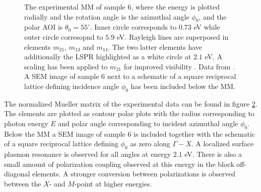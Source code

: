\begin{figure}
\begin{subfigure}{\textwidth}
\begin{subfigure}{0.49\textwidth}
    \end{subfigure}
    \label{fig:S6_reciprocallattice_schematic}
\end{subfigure}
    \caption{The experimental MM of sample 6, where the energy is plotted radially and the rotation angle is the azimuthal angle $\phi_0$, and the polar AOI is $\theta_0=55^\circ$. Inner circle corresponds to $0.73$ eV while outer circle corresopnd to $5.9$ eV. Rayleigh lines are superposed in elements $m_{21}$, $m_{13}$ and $m_{14}$. The two latter elements have additionally the LSPR highlighted as a white circle at $2.1$ eV. A scaling has been applied to $m_{21}$ for improved visibility . Data from \cite{brakstad_thesis}. A SEM image of sample 6 next to a schematic of a square reciprocal lattice defining incidence angle $\phi_0$ has been included below the MM.}
    \label{fig:S6_contour_MM_exp}
\end{figure}
The normalized Mueller matrix of the experimental data can be found in figure \ref{fig:S6_contour_MM_exp}. The elements are plotted as contour polar plots with the radius corresponding to photon energy $E$ and polar angle corresponding to incident azimuthal angle $\phi_0$. Below the MM a SEM image of sample 6 is included together with the schematic of a square reciprocal lattice defining $\phi_0$ as zero along $\Gamma-X$. A localized surface plasmon resonance is observed for all angles at energy $2.1$ eV. There is also a small amount of polarization coupling observed at this energy in the block off-diagonal elements. A stronger conversion between polarizations is observed between the $X$- and $M$-point at higher energies. %


